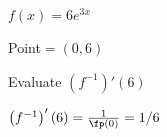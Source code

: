 {$ f(x) = 6e^{3x}$

Point$=(0,6)$ 

Evaluate $\left(f^{-1}\right)'(6)$}
{$\left(f^{-1}\right)'(6) = \frac{1}{\fp(0)} = 1/6$
}
